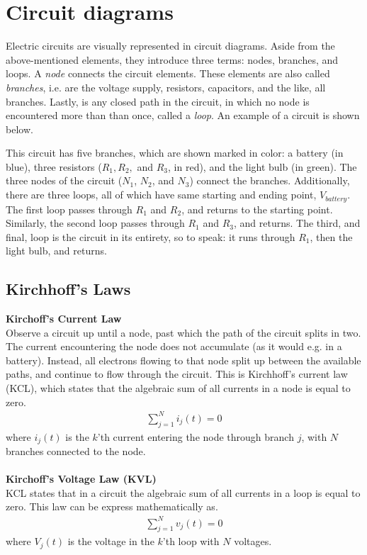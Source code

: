 \section{Circuit diagrams}
Electric circuits are visually represented in circuit diagrams. Aside from the above-mentioned elements, they introduce three terms: nodes, branches, and loops. A \textit{node} connects the circuit elements. These elements are also called \textit{branches}, i.e. are the voltage supply, resistors, capacitors, and the like, all branches. Lastly, is any closed path in the circuit, in which no node is encountered more than than once, called a \textit{loop}\cite[page~32]{bcircuit}. An example of a circuit is shown below.

\begin{figure}[H]
 
\end{figure}

This circuit has five branches, which are shown marked in color: a battery (in blue), three resistors ($R_1, R_2,$ and $R_3$, in red), and the light bulb (in green). The three nodes of the circuit ($N_1$, $N_2$, and $N_3$) connect the branches. Additionally, there are three loops, all of which have same starting and ending point, $V_{battery}$. The first loop passes through $R_1$ and $R_2$, and returns to the starting point. Similarly, the second loop passes through $R_1$ and $R_3$, and returns. The third, and final, loop is the circuit in its entirety, so to speak: it runs through $R_1$, then the light bulb, and returns. 

\subsection{Kirchhoff's Laws}
\textbf{Kirchoff's Current Law}
\\
Observe a circuit up until a node, past which the path of the circuit splits in two. The current encountering the node does not accumulate (as it would e.g. in a battery). Instead, all electrons flowing to that node split up between the available paths, and continue to flow through the circuit. This is Kirchhoff’s current law (KCL), which states that the algebraic sum of all currents in a node is equal to zero. 
\begin{align}
\sum_{j=1}^{N} i_{j}(t) = 0
\end{align}
where $i_{j}(t)$ is the $k$'th current entering the node through branch $j$, with $N$ branches connected to the node.\cite[page~32]{bcircuit}
\\
\\
\textbf{Kirchoff's Voltage Law (KVL)}
\\
KCL states that in a circuit the algebraic sum of all currents in a loop is equal to zero. This law can be express mathematically  as.
\begin{align}
\sum_{j=1}^{N} v_{j}(t) = 0
\end{align}
where $V_{j}(t)$ is the voltage in the $k$'th loop with $N$ voltages.\citep[page~34]{bcircuit}\\

